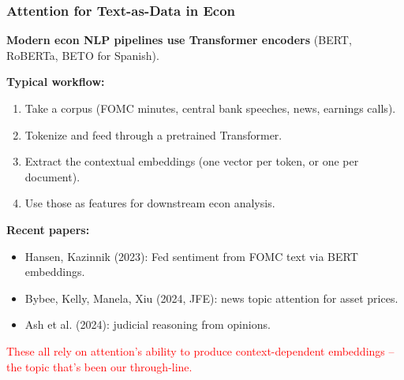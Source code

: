 \documentclass[notes,11pt, aspectratio=169]{beamer}
\begin{document}
\begin{frame}
\frametitle{Attention for Text-as-Data in Econ}

\textbf{Modern econ NLP pipelines use Transformer encoders} (BERT, RoBERTa, BETO for Spanish).

\vspace{8pt}
\textbf{Typical workflow:}
\begin{enumerate}
    \item Take a corpus (FOMC minutes, central bank speeches, news, earnings calls).
    \item Tokenize and feed through a pretrained Transformer.
    \item Extract the contextual embeddings (one vector per token, or one per document).
    \item Use those as features for downstream econ analysis.
\end{enumerate}

\vspace{8pt}
\textbf{Recent papers:}
\begin{itemize}
    \item Hansen, Kazinnik (2023): Fed sentiment from FOMC text via BERT embeddings.
    \item Bybee, Kelly, Manela, Xiu (2024, JFE): news topic attention for asset prices.
    \item Ash et al. (2024): judicial reasoning from opinions.
\end{itemize}

\vspace{6pt}
\textcolor{red}{These all rely on attention's ability to produce context-dependent embeddings -- the topic that's been our through-line.}
\end{frame}
\end{document}
